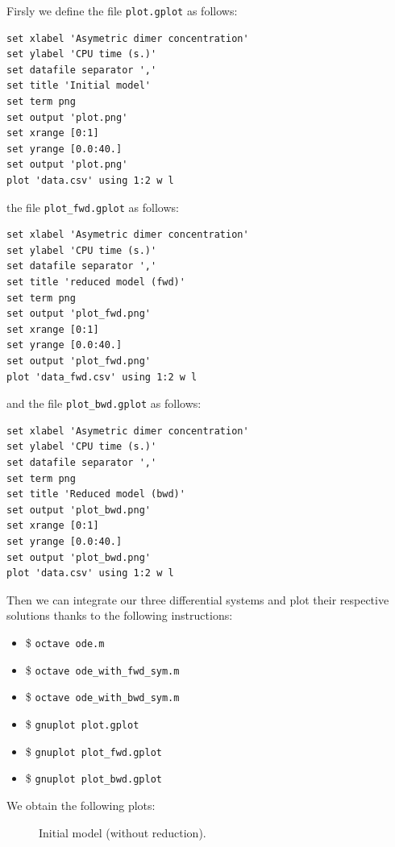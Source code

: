 \documentclass[11pt]{book}
\def\ttt#1{\texttt{#1}}
\def\ITE#1{\begin{itemize}#1\end{itemize}}
\begin{document}
Firsly we define the file \texttt{plot.gplot} as follows:
\begin{lstlisting}[language=Gnuplot]
set xlabel 'Asymetric dimer concentration'
set ylabel 'CPU time (s.)'
set datafile separator ','
set title 'Initial model'
set term png
set output 'plot.png'
set xrange [0:1]
set yrange [0.0:40.]
set output 'plot.png'
plot 'data.csv' using 1:2 w l
\end{lstlisting}
the file \texttt{plot\_fwd.gplot} as follows:
\begin{lstlisting}[language=Gnuplot]
set xlabel 'Asymetric dimer concentration'
set ylabel 'CPU time (s.)'
set datafile separator ','
set title 'reduced model (fwd)'
set term png
set output 'plot_fwd.png'
set xrange [0:1]
set yrange [0.0:40.]
set output 'plot_fwd.png'
plot 'data_fwd.csv' using 1:2 w l
\end{lstlisting}
and the file \texttt{plot\_bwd.gplot} as follows:
\begin{lstlisting}[language=Gnuplot]
set xlabel 'Asymetric dimer concentration'
set ylabel 'CPU time (s.)'
set datafile separator ','
set term png
set title 'Reduced model (bwd)'
set output 'plot_bwd.png'
set xrange [0:1]
set yrange [0.0:40.]
set output 'plot_bwd.png'
plot 'data.csv' using 1:2 w l
\end{lstlisting}

Then we can integrate our three differential systems and plot their respective  solutions thanks to the following instructions:
\ITE{
\item[\$] \ttt{octave ode.m}
\item[\$] \ttt{octave ode\_with\_fwd\_sym.m}
\item[\$] \ttt{octave ode\_with\_bwd\_sym.m}
\item[\$] \ttt{gnuplot plot.gplot}
\item[\$] \ttt{gnuplot plot\_fwd.gplot}
\item[\$] \ttt{gnuplot plot\_bwd.gplot}}

We obtain the following plots:
\begin{figure}[htp]
\centering  \begin{minipage}{0.35\linewidth}
\end{minipage}
\caption{Initial model (without reduction).}
\end{figure}
\end{document}
